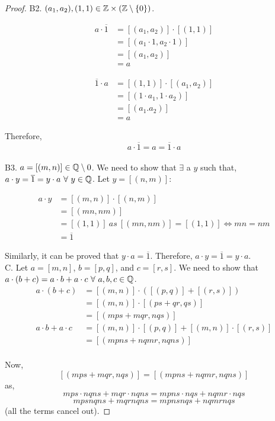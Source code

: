 \documentclass[11pt]{scrartcl}
\begin{document}
\begin{proof}
	B2. $(a_{1}, a_{2}), (1,1) \in \mathbb Z \times (\mathbb Z \setminus \{0\})$.
	
	\begin{align*}
		a \cdot \overline{1} &= [(a_{1}, a_{2})] \cdot [(1,1)]\\
		&= [(a_{1} \cdot 1, a_{2} \cdot 1)]\\
		&= [(a_{1}, a_{2})]\\
		&= a
	\end{align*}

	\begin{align*}
		\overline{1} \cdot a &= [(1,1)] \cdot [(a_{1}, a_{2})]\\
		&= [(1 \cdot a_{1}, 1 \cdot a_{2})]\\
		&= [(a_{1}. a_{2})]\\
		&= a
	\end{align*}

	Therefore, $$a \cdot \overline{1} = a = \overline{1} \cdot a$$\\
	
	B3. $a = [(m,n)] \in \mathbb Q \setminus 0$. We need to show that $\exists$ a $y$ such that, $a \cdot y = \overline{1} = y \cdot a\ \forall\ y \in \mathbb Q$. Let $y = [(n,m)]$:
	
	\begin{align*}
		a \cdot y &= [(m,n)] \cdot [(n,m)]\\
		&= [(mn, nm)]\\
		&= [(1,1)]\ as\ [(mn, nm)] = [(1,1)] \Leftrightarrow mn = nm\\
		&= \overline{1} 
	\end{align*}

	Similarly, it can be proved that $y \cdot a = \overline{1}$. Therefore, $a \cdot y = \overline{1} = y \cdot a$.\\[2pt]
	
	C. Let $a=[m,n]$, $b=[p,q]$, and $c=[r,s]$. We need to show that $a \cdot (b+c) = a \cdot b + a \cdot c\ \forall\ a,b,c \in \mathbb Q$.
	\begin{align*}
		a \cdot (b+c) &= [(m,n)] \cdot ([(p,q)]+[(r,s)]) \\
		&= [(m,n)] \cdot [(ps+qr, qs)]\\
		&= [(mps+mqr, nqs)]\\
		a\cdot b + a\cdot c &= [(m,n)]\cdot [(p,q)] + [(m,n)] \cdot [(r,s)]\\
		&= [(mpns + nqmr, nqns)]\\
	\end{align*}

	Now, $$[(mps+mqr, nqs)] = [(mpns + nqmr, nqns)]$$ as, $$mps \cdot nqns + mqr \cdot nqns = mpns \cdot nqs + nqmr \cdot nqs$$ 
	$$mpsnqns + mqrnqns = mpnsnqs + nqmrnqs$$ (all the terms cancel out).
\end{proof}
\end{document}
